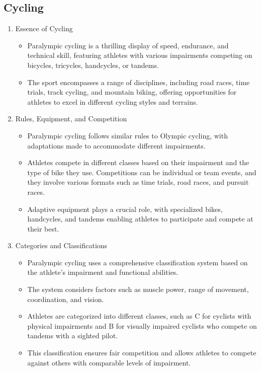 \subsection{Cycling}

\begin{enumerate}

\item Essence of Cycling
    \begin{itemize}
    \item Paralympic cycling is a thrilling display of speed, endurance, and technical skill, featuring athletes with various impairments competing on bicycles, tricycles, handcycles, or tandems.
    \item The sport encompasses a range of disciplines, including road races, time trials, track cycling, and mountain biking, offering opportunities for athletes to excel in different cycling styles and terrains. 
    \end{itemize}

\item Rules, Equipment, and Competition
    \begin{itemize}
    \item Paralympic cycling follows similar rules to Olympic cycling, with adaptations made to accommodate different impairments. 
    \item Athletes compete in different classes based on their impairment and the type of bike they use. Competitions can be individual or team events, and they involve various formats such as time trials, road races, and pursuit races. 
    \item Adaptive equipment plays a crucial role, with specialized bikes, handcycles, and tandems enabling athletes to participate and compete at their best.
    \end{itemize}

\item Categories and Classifications
    \begin{itemize}
    \item Paralympic cycling uses a comprehensive classification system based on the athlete's impairment and functional abilities. 
    \item The system considers factors such as muscle power, range of movement, coordination, and vision. 
    \item Athletes are categorized into different classes, such as C for cyclists with physical impairments and B for visually impaired cyclists who compete on tandems with a sighted pilot. 
    \item This classification ensures fair competition and allows athletes to compete against others with comparable levels of impairment.
    \end{itemize}

\end{enumerate}